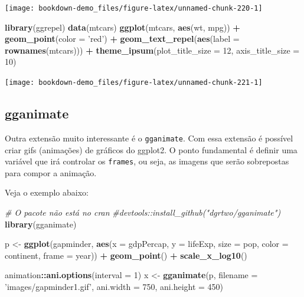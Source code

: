 \documentclass[]{book}
\newenvironment{Shaded}{\begin{snugshade}}{\end{snugshade}}
\newcommand{\KeywordTok}[1]{\textcolor[rgb]{0.13,0.29,0.53}{\textbf{#1}}}
\newcommand{\DataTypeTok}[1]{\textcolor[rgb]{0.13,0.29,0.53}{#1}}
\newcommand{\DecValTok}[1]{\textcolor[rgb]{0.00,0.00,0.81}{#1}}
\newcommand{\StringTok}[1]{\textcolor[rgb]{0.31,0.60,0.02}{#1}}
\newcommand{\CommentTok}[1]{\textcolor[rgb]{0.56,0.35,0.01}{\textit{#1}}}
\newcommand{\OperatorTok}[1]{\textcolor[rgb]{0.81,0.36,0.00}{\textbf{#1}}}
\newcommand{\NormalTok}[1]{#1}
\begin{document}
\begin{center}\texttt{[image: bookdown-demo\_files/figure-latex/unnamed-chunk-220-1]} \end{center}

\begin{Shaded}
\begin{Highlighting}[]
\KeywordTok{library}\NormalTok{(ggrepel)}
\KeywordTok{data}\NormalTok{(mtcars)}
\KeywordTok{ggplot}\NormalTok{(mtcars, }\KeywordTok{aes}\NormalTok{(wt, mpg)) }\OperatorTok{+}
\StringTok{  }\KeywordTok{geom_point}\NormalTok{(}\DataTypeTok{color =} \StringTok{'red'}\NormalTok{) }\OperatorTok{+}
\StringTok{  }\KeywordTok{geom_text_repel}\NormalTok{(}\KeywordTok{aes}\NormalTok{(}\DataTypeTok{label =} \KeywordTok{rownames}\NormalTok{(mtcars))) }\OperatorTok{+}
\StringTok{  }\KeywordTok{theme_ipsum}\NormalTok{(}\DataTypeTok{plot_title_size =} \DecValTok{12}\NormalTok{,  }
              \DataTypeTok{axis_title_size =} \DecValTok{10}\NormalTok{)}
\end{Highlighting}
\end{Shaded}

\begin{center}\texttt{[image: bookdown-demo\_files/figure-latex/unnamed-chunk-221-1]} \end{center}

\subsection{gganimate}\label{gganimate}

Outra extensão muito interessante é o \texttt{gganimate}. Com essa
extensão é possível criar gifs (animações) de gráficos do ggplot2. O
ponto fundamental é definir uma variável que irá controlar os
\texttt{frames}, ou seja, as imagens que serão sobrepostas para compor a
animação.

Veja o exemplo abaixo:

\begin{Shaded}
\begin{Highlighting}[]
\CommentTok{# O pacote não está no cran}
\CommentTok{#devtools::install_github("dgrtwo/gganimate")}
\KeywordTok{library}\NormalTok{(gganimate)}

\NormalTok{p <-}\StringTok{ }\KeywordTok{ggplot}\NormalTok{(gapminder, }\KeywordTok{aes}\NormalTok{(}\DataTypeTok{x =}\NormalTok{ gdpPercap, }\DataTypeTok{y =}\NormalTok{ lifeExp,}
                      \DataTypeTok{size =}\NormalTok{ pop, }\DataTypeTok{color =}\NormalTok{ continent,}
                      \DataTypeTok{frame =}\NormalTok{ year)) }\OperatorTok{+}
\StringTok{  }\KeywordTok{geom_point}\NormalTok{() }\OperatorTok{+}
\StringTok{  }\KeywordTok{scale_x_log10}\NormalTok{()}

\NormalTok{animation}\OperatorTok{::}\KeywordTok{ani.options}\NormalTok{(}\DataTypeTok{interval =} \DecValTok{1}\NormalTok{)}
\NormalTok{x <-}\StringTok{ }\KeywordTok{gganimate}\NormalTok{(p, }\DataTypeTok{filename =} \StringTok{'images/gapminder1.gif'}\NormalTok{,}
               \DataTypeTok{ani.width =} \DecValTok{750}\NormalTok{,}
               \DataTypeTok{ani.height =} \DecValTok{450}\NormalTok{)}
\end{Highlighting}
\end{Shaded}
\end{document}
